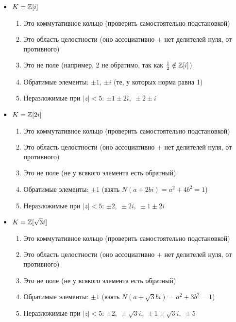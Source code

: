 \begin{itemize}
 \item $K = \mathbb{Z}[i]$

\begin{enumerate}
    \item Это коммутативное кольцо (проверить самостоятельно подстановкой)
    \item Это область целостности (оно ассоциативно + нет делителей нуля, от противного)
    \item Это не поле (например, 2 не обратимо, так как $\frac{1}{2}\notin \mathbb{Z}[i]$)
    \item Обратимые элементы: $\pm 1$, $\pm i$ (те, у которых норма равна 1)
    \item Неразложимые при $|z| < 5$: $ \pm 1 \pm 2i,\; \pm 2 \pm i$
\end{enumerate}

\item $K = \mathbb{Z}[2i]$
\begin{enumerate}
    \item Это коммутативное кольцо (проверить самостоятельно подстановкой)
    \item Это область целостности (оно ассоциативно + нет делителей нуля, от противного)
    \item Это не поле (не у всякого элемента есть обратный)
    \item Обратимые элементы: $\pm 1$ (взять $N(a + 2bi) = a^2 + 4b^2 = 1$)
    \item Неразложимые при $|z| < 5$: $\pm 2,\; \pm 2i,\; \pm 1\pm 2i $
\end{enumerate}

\item $K = \mathbb{Z}[\sqrt{3}i]$
\begin{enumerate}
    \item Это коммутативное кольцо (проверить самостоятельно подстановкой)
    \item Это область целостности (оно ассоциативно + нет делителей нуля, от противного)
    \item Это не поле (не у всякого элемента есть обратный)
    \item Обратимые элементы: $\pm 1$ (взять $N(a + \sqrt{3}bi) = a^2 + 3b^2 = 1$)
    \item Неразложимые при $|z| < 5$: $\pm2, \; \pm\sqrt{3}i,\; \pm1\pm\sqrt{3}i,\; \pm5$
\end{enumerate}


\end{itemize}
